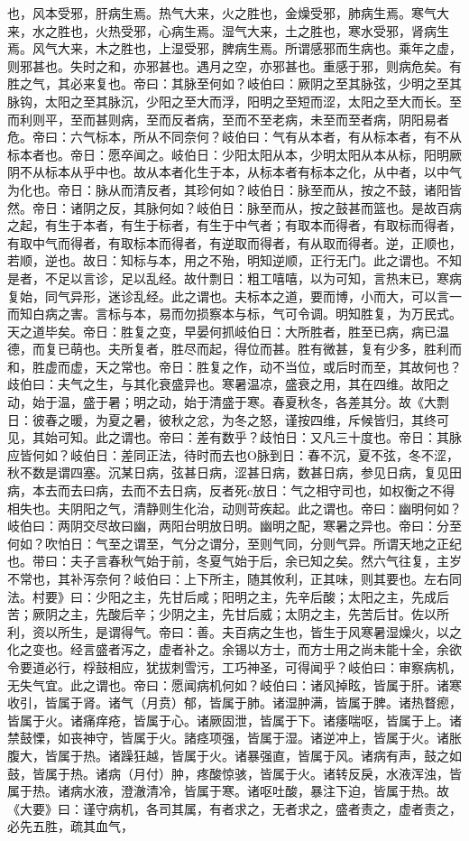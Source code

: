 \documentclass[a4paper,12pt,UTF8,twoside]{ctexbook}
\begin{document}
也，风本受邪，肝病生焉。热气大来，火之胜也，金燥受邪，肺病生焉。寒气大来，水之胜也，火热受邪，心病生焉。湿气大来，土之胜也，寒水受邪，肾病生焉。风气大来，木之胜也，上湿受邪，脾病生焉。所谓感邪而生病也。乘年之虚，则邪甚也。失时之和，亦邪甚也。遇月之空，亦邪甚也。重感于邪，则病危矣。有胜之气，其必来复也。帝曰：其脉至何如？岐伯曰：厥阴之至其脉弦，少明之至其脉钩，太阳之至其脉沉，少阳之至大而浮，阳明之至短而涩，太阳之至大而长。至而利则平，至而甚则病，至而反者病，至而不至老病，未至而至者病，阴阳易者危。帝曰：六气标本，所从不同奈何？岐伯曰：气有从本者，有从标本者，有不从标本者也。帝日：愿卒闻之。岐伯日：少阳太阳从本，少明太阳从本从标，阳明厥阴不从标本从乎中也。故从本者化生于本，从标本者有标本之化，从中者，以中气为化也。帝日：脉从而清反者，其珍何如？岐伯日：脉至而从，按之不鼓，诸阳皆然。帝日：诸阴之反，其脉何如？岐伯日：脉至而从，按之鼓甚而篮也。是故百病之起，有生于本者，有生于标者，有生于中气者；有取本而得者，有取标而得者，有取中气而得者，有取标本而得者，有逆取而得者，有从取而得者。逆，正顺也，若顺，逆也。故日：知标与本，用之不殆，明知逆顺，正行无门。此之谓也。不知是者，不足以言诊，足以乱经。故什剽日：粗工嘻嘻，以为可知，言热末已，寒病复始，同气异形，迷诊乱经。此之谓也。夫标本之道，要而博，小而大，可以言一而知白病之害。言标与本，易而勿损察本与标，气可令调。明知胜复，为万民式。天之道毕矣。帝日：胜复之变，早晏何抓岐伯日：大所胜者，胜至已病，病已温德，而复已萌也。夫所复者，胜尽而起，得位而甚。胜有微甚，复有少多，胜利而和，胜虚而虚，天之常也。帝日：胜复之作，动不当位，或后时而至，其故何也？歧伯曰：夫气之生，与其化衰盛异也。寒暑温凉，盛衰之用，其在四维。故阳之动，始于温，盛于暑；明之动，始于清盛于寒。春夏秋冬，各差其分。故《大剽日：彼春之暖，为夏之暑，彼秋之忿，为冬之怒，谨按四维，斥候皆归，其终可见，其始可知。此之谓也。帝曰：差有数乎？歧怕日：又凡三十度也。帝日：其脉应皆何如？岐伯日：差同正法，待时而去也O脉到日：春不沉，夏不弦，冬不涩，秋不数是谓四塞。沉某日病，弦甚日病，涩甚日病，数甚日病，参见日病，复见田病，本去而去曰病，去而不去日病，反者死c放日：气之相守司也，如权衡之不得相失也。夫阴阳之气，清静则生化治，动则苛疾起。此之谓也。帝曰：幽明何如？岐伯曰：两阴交尽故曰幽，两阳台明放日明。幽明之配，寒暑之异也。帝曰：分至何如？吹怕日：气至之谓至，气分之谓分，至则气同，分则气异。所谓天地之正纪也。带曰：夫子言春秋气始于前，冬夏气始于后，余已知之矣。然六气往复，主岁不常也，其补泻奈何？岐伯曰：上下所主，随其攸利，正其味，则其要也。左右同法。村要》曰：少阳之主，先甘后咸；阳明之主，先辛后酸；太阳之主，先成后苦；厥阴之主，先酸后辛；少阴之主，先甘后威；太阴之主，先苦后甘。佐以所利，资以所生，是谓得气。帝曰：善。夫百病之生也，皆生于风寒暑湿燥火，以之化之变也。经言盛者泻之，虚者补之。余锡以方士，而方士用之尚未能十全，余欲令要道必行，桴鼓相应，犹拔刺雪污，工巧神圣，可得闻乎？岐伯曰：审察病机，无失气宜。此之谓也。帝曰：愿闻病机何如？岐伯曰：诸风掉眩，皆属于肝。诸寒收引，皆属于肾。诸气（月贲）郁，皆属于肺。诸湿肿满，皆属于脾。诸热瞀瘛，皆属于火。诸痛痒疮，皆属于心。诸厥固泄，皆属于下。诸痿喘呕，皆属于上。诸禁鼓慄，如丧神守，皆属于火。諸痉项强，皆属于湿。诸逆冲上，皆属于火。诸胀腹大，皆属于热。诸躁狂越，皆属于火。诸暴强直，皆属于风。诸病有声，鼓之如鼓，皆属于热。诸病（月付）肿，疼酸惊骇，皆属于火。诸转反戾，水液浑浊，皆属于热。诸病水液，澄澈清冷，皆属于寒。诸呕吐酸，暴注下迫，皆属于热。故《大要》曰：谨守病机，各司其属，有者求之，无者求之，盛者责之，虚者责之，必先五胜，疏其血气，
\end{document}
